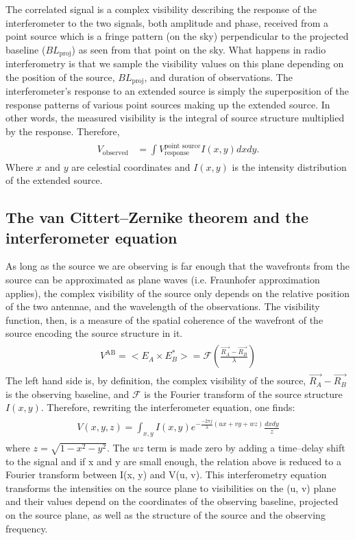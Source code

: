 \documentclass[a4wide,12pt]{book}
\begin{document}
{The correlated signal is a complex visibility describing the response of the interferometer to the two signals, both amplitude and phase, received from a point source which is a fringe pattern (on the sky) perpendicular to the projected baseline ($BL_\mathrm{proj}$) as seen from that point on the sky. What happens in radio interferometry is that we sample the visibility values on this plane depending on the position of the source, $BL_\mathrm{proj}$, and duration of observations. The interferometer's response to an extended source is simply the superposition of the response patterns of various point sources making up the extended source. In other words, the measured visibility is the integral of source structure multiplied by the response. Therefore,
\begin{align} 
\begin{split}
V_\mathrm{observed} &= \int V^\text{point source}_\text{response} I(x, y) dx dy.
\end{split}                    
\end{align}
Where $x$ and $y$ are celestial coordinates and $I(x, y)$ is the intensity distribution of the extended source.

\subsection*{The van Cittert--Zernike theorem and the interferometer equation}
As long as the source we are observing is far enough that the wavefronts from the source can be approximated as plane waves (i.e. Fraunhofer approximation applies), the complex visibility of the source only depends on the relative position of the two antennae, and the wavelength of the observations. The visibility function, then, is a measure of the spatial coherence of the wavefront of the source encoding the source structure in it.
\begin{align} 
\begin{split}
\label{eq:vC-Z}
V^\mathrm{AB} = <E_A \times E_B^*> = \mathcal{F}(\frac{\vec{R_A} - \vec{R_B}}{\lambda})
\end{split}                    
\end{align}
The left hand side is, by definition, the complex visibility of the source, $\vec{R_A} - \vec{R_B}$ is the observing baseline, and $\mathcal{F}$ is the Fourier transform of the source structure $I(x, y)$. Therefore, rewriting the interferometer equation, one finds:
\begin{align} 
\begin{split}
\label{eq:InterferometerEq}
V(x,y,z) = \int_{x,y} I(x, y) e^{-\frac{-2\pi j}{\lambda}(ux+vy+wz)} \frac{dx dy}{z}
\end{split}                    
\end{align}
where $z=\sqrt{1-x^2-y^2}$. The $wz$ term is made zero by adding a time--delay shift to the signal and if x and y are small enough, the relation above is reduced to a Fourier transform between I(x, y) and V(u, v). This interferometry equation transforms the intensities on the source plane to visibilities on the (u, v) plane and their values depend on the coordinates of the observing baseline, projected on the source plane, as well as the structure of the source and the observing frequency. 

}
\end{document}
